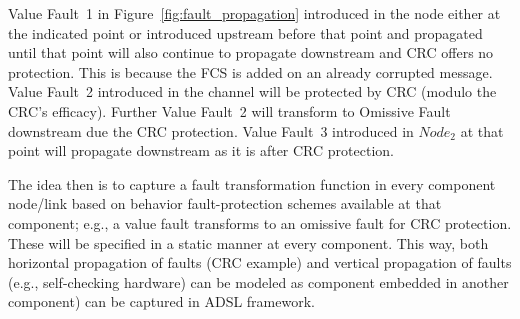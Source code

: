 Value Fault~1 in Figure~\ref{fig:fault_propagation} introduced in the node
either at the indicated point or introduced upstream before that point and
propagated until that point will also continue to propagate downstream and
CRC
offers no protection. This is because the FCS is added on an already corrupted
message. Value Fault~2 introduced in the channel will be protected by CRC
(modulo the CRC's efficacy). Further Value Fault~2 will transform to Omissive Fault downstream due the CRC protection. 
Value Fault~3 introduced in $Node_2$ at that
point will propagate downstream as it is after CRC protection.

The idea then is to capture a fault transformation function in every
component
node/link based on behavior fault-protection schemes available at that component;
e.g., a value fault transforms to an omissive fault for CRC protection. 
These will be
specified in a static manner at every component. This way, both horizontal
propagation of faults (CRC example) and vertical propagation of faults
(e.g., self-checking hardware) can be modeled as component embedded
in another
component) can be captured in ADSL framework.


